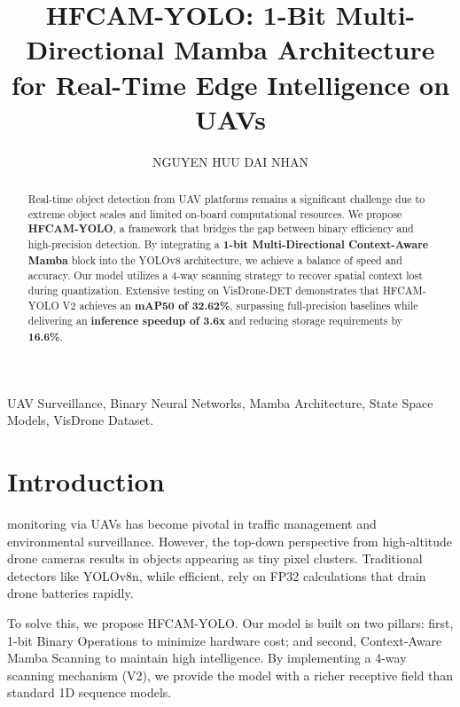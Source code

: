 \documentclass[journal]{IEEEtran}
\begin{document}
\title{HFCAM-YOLO: 1-Bit Multi-Directional Mamba Architecture for Real-Time Edge Intelligence on UAVs}


\author{NGUYEN HUU DAI NHAN}
        


\maketitle

\begin{abstract} 
Real-time object detection from UAV platforms remains a significant challenge due to extreme object scales and limited on-board computational resources. We propose \textbf{HFCAM-YOLO}, a framework that bridges the gap between binary efficiency and high-precision detection. By integrating a \textbf{1-bit Multi-Directional Context-Aware Mamba} block into the YOLOv8 architecture, we achieve a balance of speed and accuracy. Our model utilizes a 4-way scanning strategy to recover spatial context lost during quantization. Extensive testing on VisDrone-DET demonstrates that HFCAM-YOLO V2 achieves an \textbf{mAP50 of 32.62\%}, surpassing full-precision baselines while delivering an \textbf{inference speedup of 3.6x} and reducing storage requirements by \textbf{16.6\%}.
\end{abstract}

\begin{IEEEkeywords}
UAV Surveillance, Binary Neural Networks, Mamba Architecture, State Space Models, VisDrone Dataset.
\end{IEEEkeywords}

\section{Introduction}
 monitoring via UAVs has become pivotal in traffic management and environmental surveillance. However, the top-down perspective from high-altitude drone cameras results in objects appearing as tiny pixel clusters. Traditional detectors like YOLOv8n, while efficient, rely on FP32 calculations that drain drone batteries rapidly. 

To solve this, we propose HFCAM-YOLO. Our model is built on two pillars: first, 1-bit Binary Operations to minimize hardware cost; and second, Context-Aware Mamba Scanning to maintain high intelligence. By implementing a 4-way scanning mechanism (V2), we provide the model with a richer receptive field than standard 1D sequence models.
\end{document}
